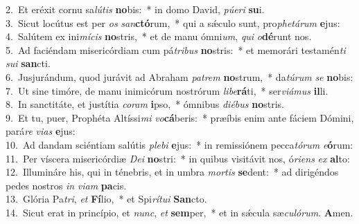 {2.~}Et eréxit cornu sa\textit{lú}\textit{tis} \textbf{no}bis:~* in domo David, \textit{pú}\textit{e}\textit{ri} \textbf{su}i.\\
{3.~}Sicut locútus est per \textit{os} \textit{san}\textbf{ctó}rum,~* qui a sǽculo sunt, pro\textit{phe}\textit{tá}\textit{rum} \textbf{e}jus:\\
{4.~}Salútem ex ini\textit{mí}\textit{cis} \textbf{no}stris,~* et de manu ómni\textit{um}, \textit{qui} \textit{o}\textbf{dé}runt nos.\\
{5.~}Ad faciéndam misericórdiam cum pá\textit{tri}\textit{bus} \textbf{no}stris:~* et memorári testamén\textit{ti} \textit{su}\textit{i} \textbf{san}cti.\\
{6.~}Jusjurándum, quod jurávit ad Abraham \textit{pa}\textit{trem} \textbf{no}strum,~* da\textit{tú}\textit{rum} \textit{se} \textbf{no}bis:\\
{7.~}Ut sine timóre, de manu inimicórum nostrórum \textit{li}\textit{be}\textbf{rá}ti,~* ser\textit{vi}\textit{á}\textit{mus} \textbf{il}li.\\
{8.~}In sanctitáte, et justítia \textit{co}\textit{ram} \textbf{i}pso,~* ómnibus \textit{di}\textit{é}\textit{bus} \textbf{no}stris.\\
{9.~}Et tu, puer, Prophéta Altíssi\textit{mi} \textit{vo}\textbf{cá}beris:~* præíbis enim ante fáciem Dómini, pará\textit{re} \textit{vi}\textit{as} \textbf{e}jus:\\
{10.~}Ad dandam sciéntiam salútis \textit{ple}\textit{bi} \textbf{e}jus:~* in remissiónem pecca\textit{tó}\textit{rum} \textit{e}\textbf{ó}rum:\\
{11.~}Per víscera misericórdiæ \textit{De}\textit{i} \textbf{no}stri:~* in quibus visitávit nos, ó\textit{ri}\textit{ens} \textit{ex} \textbf{al}to:\\
{12.~}Illumináre his, qui in ténebris, et in umbra \textit{mor}\textit{tis} \textbf{se}dent:~* ad dirigéndos pedes nostros \textit{in} \textit{vi}\textit{am} \textbf{pa}cis.\\
{13.~}Glória Pa\textit{tri}, \textit{et} \textbf{Fí}lio,~* et Spi\textit{rí}\textit{tu}\textit{i} \textbf{San}cto.\\
{14.~}Sicut erat in princípio, et \textit{nunc}, \textit{et} \textbf{sem}per,~* et in sǽcula sæ\textit{cu}\textit{ló}\textit{rum}. \textbf{A}men.\\
